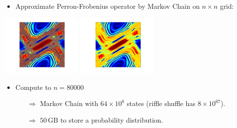 \documentclass[12pt,t]{beamer}
\begin{document}
\begin{frame}
  \begin{itemize}
  \item Approximate Perron-Frobenius operator by Markov Chain on $n
    \times n$ grid:
  \end{itemize}
  \begin{center}
    \includegraphics[height=3cm,trim=3.5cm 1.5cm 3cm 1cm]{standardmapsimuexact}
    \hspace{1cm}
    \includegraphics[height=3cm,trim=3.5cm 1.5cm 3cm 1cm]{standardmapsimumarkov}
  \end{center}
  \begin{itemize}
  \item Compute to $n = 80000$
    \begin{itemize}
      \item[$\Longrightarrow$] Markov Chain with $64 \times 10^8$
        states (riffle shuffle has $8 \times 10^{67}$).
      \item[$\Longrightarrow$] $50\,\text{GB}$ to store a probability
        distribution.
    \end{itemize}
  \end{itemize}
\end{frame}
\end{document}
